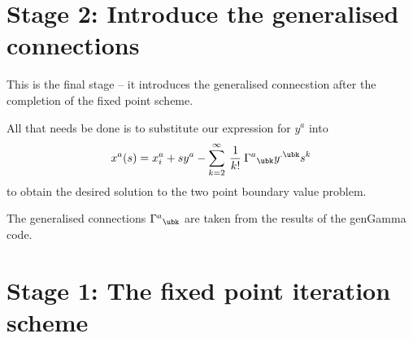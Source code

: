 \documentclass[12pt]{cdblatex}
\begin{document}
\section*{Stage 2: Introduce the generalised connections}

This is the final stage -- it introduces the generalised connecstion after the
completion of the fixed point scheme.

All that needs be done is to substitute our expression for $y^a$ into
\begin{align}
   \label{eq:solBVP}
   x^a(s) = x^a_i + s y^a - \sum_{k=2}^\infty\>\frac{1}{k!}\>\Gamma^{a}{}_{\ubk} y^{.\ubk} s^k
\end{align}
to obtain the desired solution to the two point boundary value problem.

The generalised connections $\Gamma^{a}{}_{\ubk}$ are taken from the results of the
{\tts genGamma} code.

\clearpage

\section*{Stage 1: The fixed point iteration scheme}
\end{document}
